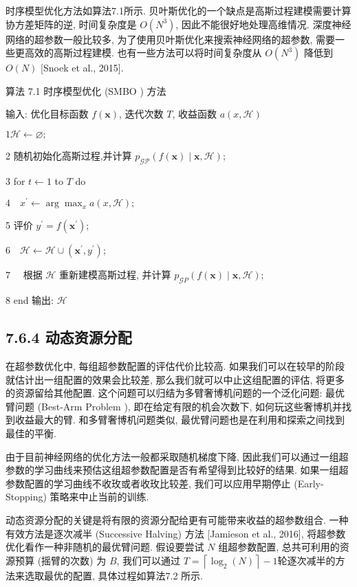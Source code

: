 \documentclass[10pt]{article}
\begin{document}
时序模型优化方法如算法7.1所示. 贝叶斯优化的一个缺点是高斯过程建模需要计算协方差矩阵的逆, 时间复杂度是 $O\left(N^{3}\right)$, 因此不能很好地处理高维情况. 深度神经网络的超参数一般比较多, 为了使用贝叶斯优化来搜索神经网络的超参数, 需要一些更高效的高斯过程建模. 也有一些方法可以将时间复杂度从 $O\left(N^{3}\right)$ 降低到 $O(N)$ [Snoek et al., 2015].

算法 7.1 时序模型优化 (SMBO ) 方法

输入: 优化目标函数 $f(\boldsymbol{x})$, 迭代次数 $T$, 收益函数 $a(x, \mathcal{H})$

$1 \mathcal{H} \leftarrow \varnothing ;$

2 随机初始化高斯过程,并计算 $p_{\mathcal{G P}}(f(\boldsymbol{x}) \mid \boldsymbol{x}, \mathcal{H})$;

3 for $t \leftarrow 1$ to $T$ do

$4 \quad x^{\prime} \leftarrow \arg \max _{x} a(x, \mathcal{H}) ;$

5 评价 $y^{\prime}=f\left(\boldsymbol{x}^{\prime}\right)$;

$6 \quad \mathcal{H} \leftarrow \mathcal{H} \cup\left(\boldsymbol{x}^{\prime}, y^{\prime}\right)$;

$7 \quad$ 根据 $\mathcal{H}$ 重新建模高斯过程, 并计算 $p_{\mathcal{G} P}(f(\boldsymbol{x}) \mid \boldsymbol{x}, \mathcal{H})$;

8 end 输出: $\mathcal{H}$

\subsection*{7.6.4 动态资源分配}
在超参数优化中, 每组超参数配置的评估代价比较高. 如果我们可以在较早的阶段就估计出一组配置的效果会比较差, 那么我们就可以中止这组配置的评估, 将更多的资源留给其他配置. 这个问题可以归结为多臂奢博机问题的一个泛化问题: 最优臂问题 (Best-Arm Problem ), 即在给定有限的机会次数下, 如何玩这些奢博机并找到收益最大的臂. 和多臂奢博机问题类似, 最优臂问题也是在利用和探索之间找到最佳的平衡.

由于目前神经网络的优化方法一般都采取随机梯度下降, 因此我们可以通过一组超参数的学习曲线来预估这组超参数配置是否有希望得到比较好的结果. 如果一组超参数配置的学习曲线不收玫或者收玫比较差, 我们可以应用早期停止 (Early-Stopping) 策略来中止当前的训练.

动态资源分配的关键是将有限的资源分配给更有可能带来收益的超参数组合. 一种有效方法是逐次减半 (Successive Halving) 方法 [Jamieson et al., 2016], 将超参数优化看作一种非随机的最优臂问题. 假设要尝试 $N$ 组超参数配置, 总共可利用的资源预算 (摇臂的次数) 为 $B$, 我们可以通过 $T=\left\lceil\log _{2}(N)\right\rceil-1$轮逐次减半的方法来选取最优的配置, 具体过程如算法7.2 所示.
\end{document}
